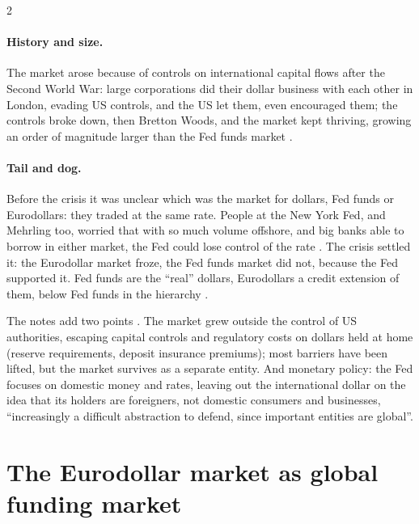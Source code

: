 \begin{paracol}{2}
\paragraph{History and size.} The market arose because of controls on international capital flows after the Second World War: large corporations did their dollar business
with each other in London, evading US controls, and the US let them, even encouraged them; the controls broke down, then Bretton Woods, and the market kept thriving, growing
an order of magnitude larger than the Fed funds market .

\paragraph{Tail and dog.} Before the crisis it was unclear which was the market for dollars, Fed funds or Eurodollars: they traded at the same rate. People at the New York Fed,
and Mehrling too, worried that with so much volume offshore, and big banks able to borrow in either market, the Fed could lose control of the rate
. The crisis settled it: the Eurodollar market froze, the Fed funds market did not, because the Fed supported it. Fed funds are the
``real'' dollars, Eurodollars a credit extension of them, below Fed funds in the hierarchy .

The notes add two points . The market grew outside the control of US authorities, escaping capital controls and regulatory costs on dollars held at home (reserve
requirements, deposit insurance premiums); most barriers have been lifted, but the market survives as a separate entity. And monetary policy: the Fed focuses on domestic money
and rates, leaving out the international dollar on the idea that its holders are foreigners, not domestic consumers and businesses, ``increasingly a difficult abstraction to
defend, since important entities are global''.

\section{The Eurodollar market as global funding market}\label{sec:ed-funding}


\end{paracol}
